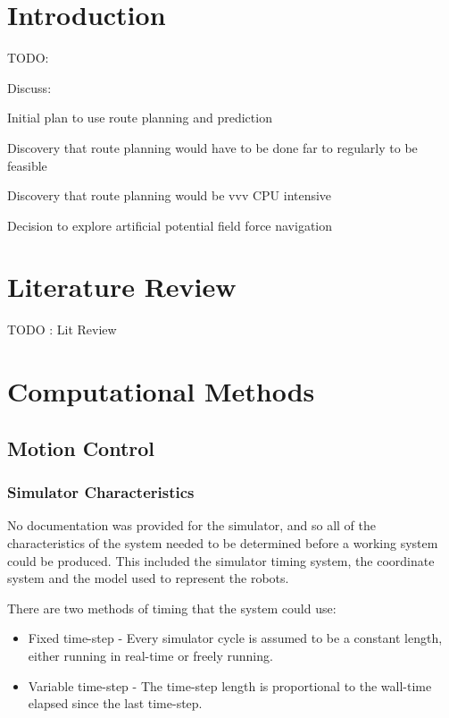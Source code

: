 \documentclass[10pt]{article}
\begin{document}


\section{Introduction}

TODO:

Discuss:
 
Initial plan to use route planning and prediction

Discovery that route planning would have to be done far to regularly to be
feasible

Discovery that route planning would be vvv CPU intensive

Decision to explore artificial potential field force navigation

\section{Literature Review}

TODO : Lit Review

\section{Computational Methods}

\subsection{Motion Control\label{sub:motionControl}}

\subsubsection{Simulator Characteristics}

No documentation was provided for the simulator, and so all of the
characteristics of the system needed to be determined before a working system
could be produced.  This included the simulator timing system, the coordinate
system and the model used to represent the robots.

There are two methods of timing that the system could use:
\begin{itemize}
 \item Fixed time-step - Every simulator cycle is assumed to be a constant
 length, either running in real-time or freely running.
 \item Variable time-step - The time-step length is proportional to the
 wall-time elapsed since the last time-step.
\end{itemize}
\end{document}
